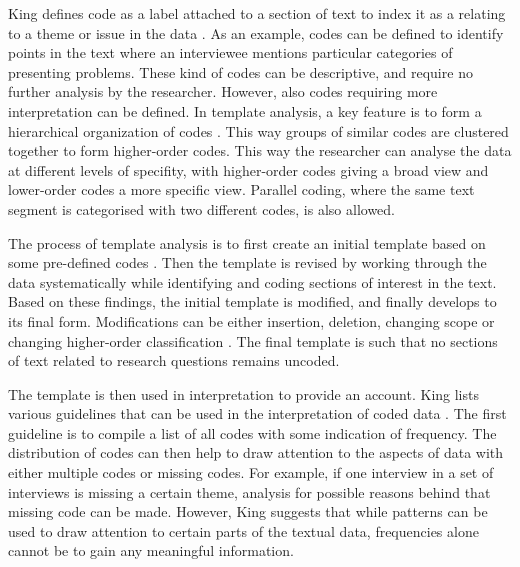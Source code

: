 \documentclass[english, grading]{tktltiki2}
\theoremstyle{definition}
\theoremstyle{remark}
\begin{document}
King defines code as a label attached to a section of text to index it as a relating to a theme or issue in the data \cite{king2004using}. As an example, codes can be defined to identify points in the text where an interviewee mentions particular categories of presenting problems. These kind of codes can be descriptive, and require no further analysis by the researcher. However, also codes requiring more interpretation can be defined. In template analysis, a key feature is to form a hierarchical organization of codes \cite{king2004using}. This way groups of similar codes are clustered together to form higher-order codes. This way the researcher can analyse the data at different levels of specifity, with higher-order codes giving a broad view and lower-order codes a more specific view. Parallel coding, where the same text segment is categorised with two different codes, is also allowed. 

The process of template analysis is to first create an initial template based on some pre-defined codes \cite{king2004using}. Then the template is revised by working through the data systematically while identifying and coding sections of interest in the text. Based on these findings, the initial template is modified, and finally develops to its final form. Modifications can be either insertion, deletion, changing scope or changing higher-order classification \cite{king2004using}. The final template is such that no sections of text related to research questions remains uncoded. 

The template is then used in interpretation to provide an account. King lists various guidelines that can be used in the interpretation of coded data \cite{king2004using}. The first guideline is to compile a list of all codes with some indication of frequency. The distribution of codes can then help to draw attention to the aspects of data with either multiple codes or missing codes. For example, if one interview in a set of interviews is missing a certain theme, analysis for possible reasons behind that missing code can be made. However, King suggests that while patterns can be used to draw attention to certain parts of the textual data, frequencies alone cannot be to gain any meaningful information. 
\end{document}
